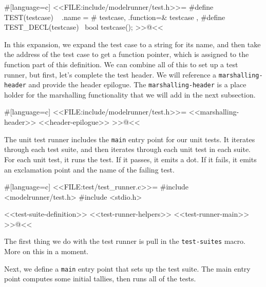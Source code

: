 #[language=c]
<<FILE:include/modelrunner/test.h>>=
#define TEST(testcase) \
    { .name = # testcase, .function=& testcase },
#define TEST_DECL(testcase) \
    bool testcase();
>>@<<

In this expansion, we expand the test case to a string for its name, and then
take the address of the test case to get a function pointer, which is assigned
to the function part of this definition. We can combine all of this to set up a
test runner, but first, let's complete the test header.  We will reference a
\verb/marshalling-header/ and provide the header epilogue.  The
\verb/marshalling-header/ is a place holder for the marshalling functionality
that we will add in the next subsection.

#[language=c]
<<FILE:include/modelrunner/test.h>>=
<<marshalling-header>>
<<header-epilogue>>
>>@<<

The unit test runner includes the \verb/main/ entry point for our unit tests. It
iterates through each test suite, and then iterates through each unit test in
each suite. For each unit test, it runs the test. If it passes, it emits a dot.
If it fails, it emits an exclamation point and the name of the failing test.

#[language=c]
<<FILE:test/test_runner.c>>=
#include <modelrunner/test.h>
#include <stdio.h>

<<test-suite-definition>>
<<test-runner-helpers>>
<<test-runner-main>>
>>@<<

\newpage

The first thing we do with the test runner is pull in the \verb/test-suites/
macro.  More on this in a moment.

Next, we define a \verb/main/ entry point that sets up the test suite. The main
entry point computes some initial tallies, then runs all of the tests.

